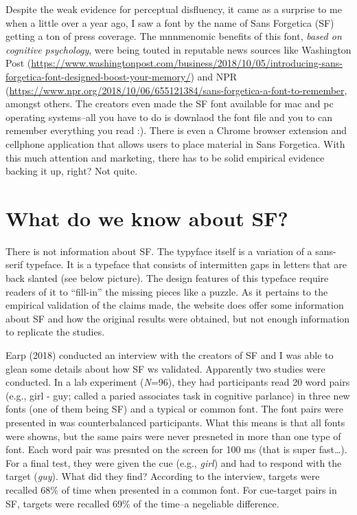 \documentclass[doc]{apa6}
\begin{document}
Despite the weak evidence for perceptual disfluency, it came as a surprise to me when a little over a year ago, I saw a font by the name of Sans Forgetica (SF) getting a ton of press coverage. The mnnmenomic benefits of this font, \emph{based on cognitive psychology}, were being touted in reputable news sources like Washington Post (\url{https://www.washingtonpost.com/business/2018/10/05/introducing-sans-forgetica-font-designed-boost-your-memory/}) and NPR (\url{https://www.npr.org/2018/10/06/655121384/sans-forgetica-a-font-to-remember}, amongst others. The creators even made the SF font available for mac and pc operating systems--all you have to do is downlaod the font file and you to can remember everything you read :). There is even a Chrome browser extension and cellphone application that allows users to place material in Sans Forgetica. With this much attention and marketing, there has to be solid empirical evidence backing it up, right? Not quite.

\hypertarget{what-do-we-know-about-sf}{%
\section{What do we know about SF?}\label{what-do-we-know-about-sf}}

There is not information about SF. The typyface itself is a variation of a sans-serif typeface. It is a typeface that consists of intermitten gaps in letters that are back slanted (see below picture). The design features of this typeface require readers of it to \enquote{fill-in} the missing pieces like a puzzle. As it pertains to the empirical validation of the claims made, the website does offer some information about SF and how the original results were obtained, but not enough information to replicate the studies.

Earp (2018) conducted an interview with the creators of SF and I was able to glean some details about how SF ws validated. Apparently two studies were conducted. In a lab experiment (\emph{N}=96), they had participants read 20 word pairs (e.g., girl - guy; called a paried associates task in cognitive parlance) in three new fonts (one of them being SF) and a typical or common font. The font pairs were presented in was counterbalanced participants. What this means is that all fonts were showns, but the same pairs were never presneted in more than one type of font. Each word pair was presnted on the screen for 100 ms (that is super fast\ldots{}). For a final test, they were given the cue (e.g., \emph{girl}) and had to respond with the target (\emph{guy}). What did they find? According to the interview, targets were recalled 68\% of time when presented in a common font. For cue-target pairs in SF, targets were recalled 69\% of the time--a negeliable difference.
\end{document}
